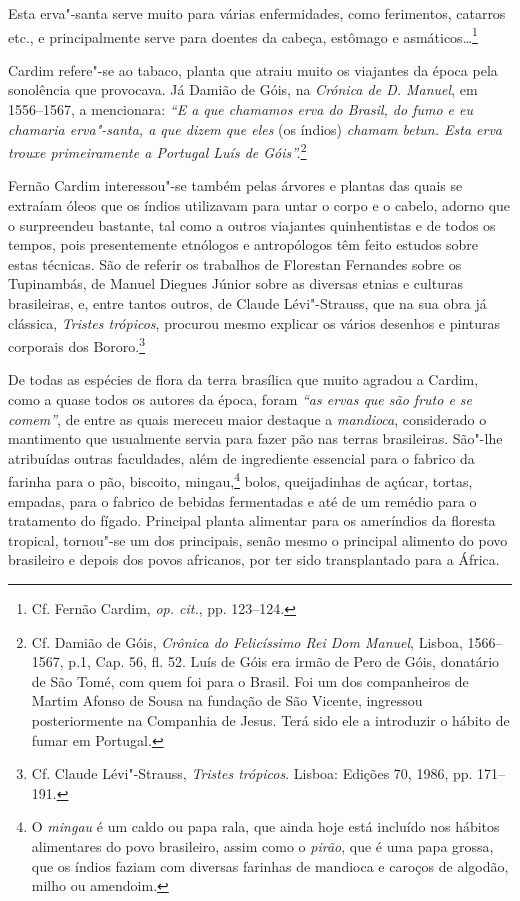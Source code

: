 \begin{hedraquote}
Esta erva"-santa serve muito para várias enfermidades, como
ferimentos, catarros etc., e principalmente serve para doentes da
cabeça, estômago e asmáticos\ldots{}\footnote{ Cf. Fernão Cardim, \textit{op. cit.}, pp. 123--124.} 
\end{hedraquote}

 Cardim refere"-se ao tabaco, planta que atraiu muito os
viajantes da época pela sonolência que provocava. Já Damião de Góis, na
\textit{Crónica de D. Manuel}, em 1556--1567, a mencionara: \textit{``E
a que chamamos erva do Brasil, do fumo e eu chamaria erva"-santa, a que
dizem que eles} (os índios) \textit{chamam betun. Esta erva
trouxe primeiramente a Portugal Luís de Góis''.}\footnote{ Cf. Damião 
de Góis, \textit{Crônica do Felicíssimo Rei Dom Manuel}, 
Lisboa, 1566--1567, p.1, Cap. 56, fl. 52. Luís de Góis era irmão de
Pero de Góis, donatário de São Tomé, com quem foi para o Brasil. Foi um
dos companheiros de Martim Afonso de Sousa na fundação de São Vicente,
ingressou posteriormente na Companhia de Jesus. Terá sido ele a
introduzir o hábito de fumar em Portugal.}

 Fernão Cardim interessou"-se também pelas árvores
e plantas das quais se extraíam óleos que os índios utilizavam para
untar o corpo e o cabelo, adorno que o surpreendeu bastante, tal como a
outros viajantes quinhentistas e de todos os tempos, pois presentemente
etnólogos e antropólogos têm feito estudos sobre estas técnicas. São de
referir os trabalhos de Florestan Fernandes sobre os Tupinambás, de
Manuel Diegues Júnior sobre as diversas etnias e culturas brasileiras,
e, entre tantos outros, de Claude Lévi"-Strauss, que na sua obra já
clássica, \textit{Tristes trópicos}, procurou mesmo explicar os vários
desenhos e pinturas corporais dos Bororo.\footnote{ Cf. Claude
Lévi"-Strauss, \textit{Tristes trópicos}. Lisboa: Edições
70, 1986, pp. 171--191.}
 
 De todas as espécies de flora da terra brasílica que muito
agradou a Cardim, como a quase todos os autores da época, foram
\textit{``as ervas que são fruto e se comem''}, de entre as quais mereceu
maior destaque a \textit{mandioca}, considerado o mantimento que
usualmente servia para fazer pão nas terras brasileiras. São"-lhe
atribuídas outras faculdades, além de ingrediente essencial para o
fabrico da farinha para o pão, biscoito, mingau,\footnote{ O \textit{mingau} 
é um caldo ou papa rala, que ainda hoje está incluído
nos hábitos alimentares do povo brasileiro, assim como o
\textit{pirão}, que é uma papa grossa, que os índios faziam com
diversas farinhas de mandioca e caroços de algodão, milho ou
amendoim.} bolos, queijadinhas de açúcar, tortas, empadas, para o
fabrico de bebidas fermentadas e até de um remédio para o tratamento
do fígado. Principal planta alimentar para os ameríndios da floresta
tropical, tornou"-se um dos principais, senão mesmo o principal
alimento do povo brasileiro e depois dos povos africanos, por ter sido
transplantado para a África.

